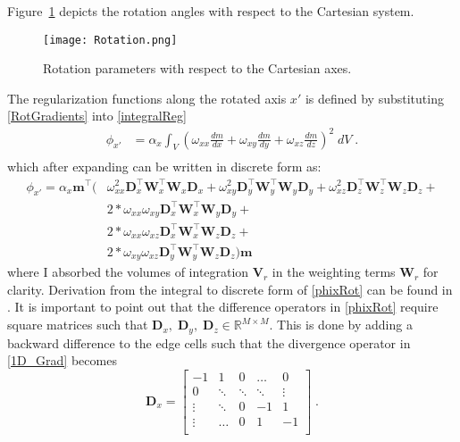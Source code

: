 Figure~\ref{Rotation} depicts the rotation angles with respect to the Cartesian system.
\begin{figure}[h!]\centering
\texttt{[image: Rotation.png]}
\caption{Rotation parameters with respect to the Cartesian axes.}
\label{Rotation}
\end{figure}
The regularization functions along the rotated axis $x'$ is defined by substituting \eqref{RotGradients} into \eqref{integralReg}
\begin{equation}
\begin{split}\label{rot2norm}
\phi_{x'} &= \alpha_x \int_V \left( \omega_{xx}\frac{d m}{dx} + \omega_{xy}\frac{d m}{dy} + \omega_{xz}\frac{d m}{dz}\right)^2 \;dV\;. \\
\end{split}
\end{equation}
which after expanding can be written in discrete form as:
\begin{equation}\label{phixRot}
\begin{split}
\phi_{x'} = \alpha_x \mathbf{m}^\top \bigg(&\omega_{xx}^2\mathbf{D}_x^\top\mathbf{W}_x^\top \mathbf{W}_x\mathbf{D}_x + \omega_{xy}^2\mathbf{D}_y^\top\mathbf{W}_y^\top\mathbf{W}_y \mathbf{D}_y + \omega_{xz}^2\mathbf{D}_z^\top\mathbf{W}_z^\top \mathbf{W}_z\mathbf{D}_z +\\
&2*\omega_{xx}\omega_{xy}\mathbf{D}_x^\top \mathbf{W}_x^\top\mathbf{W}_y\mathbf{D}_y +\\
&2*\omega_{xx}\omega_{xz}\mathbf{D}_x^\top \mathbf{W}_x^\top\mathbf{W}_z\mathbf{D}_z +\\
&2*\omega_{xy}\omega_{xz}\mathbf{D}_y^\top \mathbf{W}_y^\top\mathbf{W}_z\mathbf{D}_z \bigg) \mathbf{m}
\end{split}
\end{equation}
where I absorbed the volumes of integration $\mathbf{V}_r$ in the weighting terms $\mathbf{W}_r$ for clarity.
Derivation from the integral to discrete form of \eqref{phixRot} can be found in \cite{LiDWO2000}.
It is important to point out that the difference operators in \eqref{phixRot} require square matrices such that $\mathbf{D}_x,\;\mathbf{D}_y,\;\mathbf{D}_z \in \mathbb{R}^{M \times M}$. This is done by adding a backward difference to the edge cells such that the divergence operator in \eqref{1D_Grad} becomes
\begin{equation}\label{1D_GradSquare}
\mathbf{D}_x =
		\begin{bmatrix}
			-1		& 		1	& 	0		& \dots 		& 0 \\
			0 		& 	\ddots	& 	 \ddots	& \ddots 	& \vdots \\
			\vdots	& 		 \ddots	& 0	& -1 & 1\\
			\vdots	& 		 \dots	& 0	& 1 & -1\\
		 \end{bmatrix}\;.
\end{equation}
